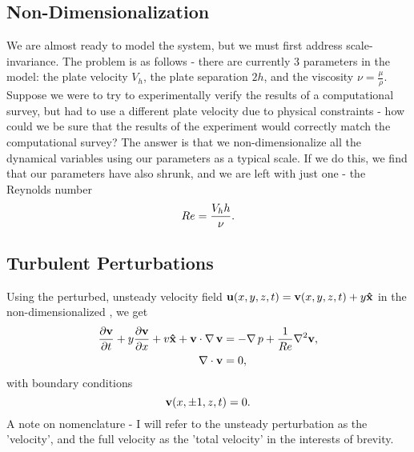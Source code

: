 \subsection{Non-Dimensionalization} 
We are almost ready to model the system, but we must first address scale-invariance. The problem is as follows - there are currently 3 parameters in the model: the plate velocity $V_h$, the plate separation $2h$, and the viscosity $\nu = \frac{\mu}{\rho}$. Suppose we were to try to experimentally verify the results of a computational survey, but had to use a different plate velocity due to physical constraints - how could we be sure that the results of the experiment would correctly match the computational survey? The answer is that we non-dimensionalize all the dynamical variables using our parameters as a typical scale. If we do this, we find that our parameters have also shrunk, and we are left with just one - the Reynolds number 
\begin{equation}
Re = \dfrac{V_h h}{\nu}.
\end{equation}

\subsection{Turbulent Perturbations}
Using the perturbed, unsteady velocity field $\mathbf{u}(x,y,z,t) = \mathbf{v} (x,y,z,t)+ y\mathbf{\hat{x}}$ in the non-dimensionalized , we get 
\begin{align}
\pder{1}{\Vector{v}}{t} + y\pder{1}{\Vector{v}}{x} + v\Vector{\hat{x}} + \Vector{v}\cdot\Grad{\Vector{v}} &= -\Grad{p} + \frac{1}{\ReN} \nabla^2\Vector{v},\\
\Div{\Vector{v}} &= 0,
\end{align}
with boundary conditions 
\begin{equation}
\mathbf{v}(x,\pm 1,z,t) = 0.
\end{equation}
A note on nomenclature - I will refer to the unsteady perturbation as the 'velocity', and the full velocity as the 'total velocity' in the interests of brevity. 
